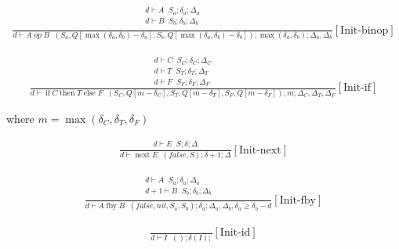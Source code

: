 \documentclass{scrartcl}
\DeclareMathOperator{\ifop}{if}
\DeclareMathOperator{\thenop}{then}
\DeclareMathOperator{\elseop}{else}
\DeclareMathOperator{\fby}{fby}
\DeclareMathOperator{\nextop}{next}
\DeclareMathOperator{\initrel}{\overset{init}{\Rightarrow}}
\begin{document}
    \begin{align*}
    \frac{
        \begin{matrix}
        d \vdash A \initrel S_a; \delta_a; \Delta_a \\
        d \vdash B \initrel S_b; \delta_b; \Delta_b \\
        \end{matrix}
    }{
        d \vdash A \; op \; B \initrel (S_a, Q[\max(\delta_a, \delta_b) - \delta_a], S_b, Q[\max(\delta_a, \delta_b) - \delta_b]); \max(\delta_a, \delta_b); \Delta_a, \Delta_b
    }[\text{Init-binop}]
    \end{align*}
    
    \begin{align*}
    \frac{
        \begin{matrix}
        d \vdash C \initrel S_C; \delta_C; \Delta_C \\
        d \vdash T \initrel S_T; \delta_T; \Delta_T \\
        d \vdash F \initrel S_F; \delta_F; \Delta_F
        \end{matrix}
    }{
        d \vdash \ifop C \thenop T \elseop F \initrel (S_C, Q[m-\delta_C], S_T, Q[m-\delta_T], S_F, Q[m-\delta_F]); m; \Delta_C, \Delta_T, \Delta_F
    }[\text{Init-if}]
    \end{align*}
    
    where $m = \max(\delta_C, \delta_T, \delta_F)$
    
    \begin{align*}
    \frac{
        \begin{matrix}
        d \vdash E \initrel S; \delta; \Delta
        \end{matrix}
    }{
        d \vdash \nextop E \initrel (false, S); \delta+1; \Delta
    }[\text{Init-next}]
    \end{align*}
    
    \begin{align*}
    \frac{
        \begin{matrix}
        d \vdash A \initrel S_a; \delta_a; \Delta_a \\
        d+1 \vdash B \initrel S_b; \delta_b; \Delta_b \\
        \end{matrix}
    }{
        d \vdash A \fby B \initrel (false, nil, S_a, S_b); \delta_a; \Delta_a, \Delta_b, \delta_a \geq \delta_b - d
    }[\text{Init-fby}]
    \end{align*}
    
    \begin{align*}
    \frac{}{
        d \vdash I \initrel (); \delta(I);
    }[\text{Init-id}]
    \end{align*}
    
\end{document}
